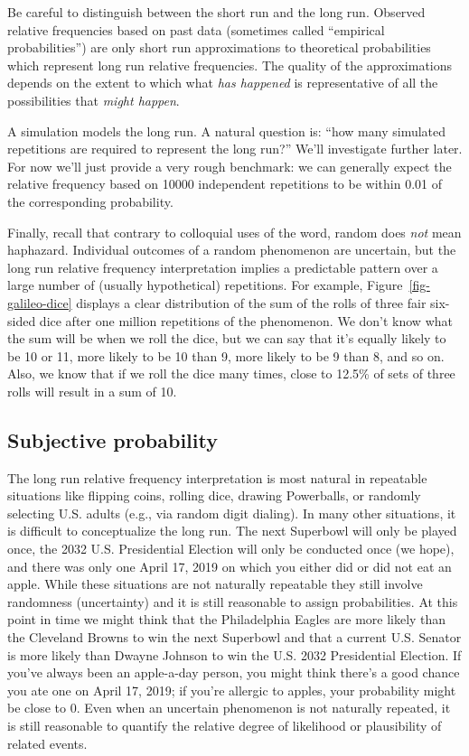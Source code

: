 \documentclass[
  letterpaper,
  DIV=11,
  numbers=noendperiod]{scrreprt}
\theoremstyle{plain}
\theoremstyle{definition}
\theoremstyle{definition}
\theoremstyle{definition}
\theoremstyle{remark}
\begin{document}
Be careful to distinguish between the short run and the long run.
Observed relative frequencies based on past data (sometimes called
``empirical probabilities'') are only short run approximations to
theoretical probabilities which represent long run relative frequencies.
The quality of the approximations depends on the extent to which what
\emph{has happened} is representative of all the possibilities that
\emph{might happen}.

A simulation models the long run. A natural question is: ``how many
simulated repetitions are required to represent the long run?'' We'll
investigate further later. For now we'll just provide a very rough
benchmark: we can generally expect the relative frequency based on 10000
independent repetitions to be within 0.01 of the corresponding
probability.

Finally, recall that contrary to colloquial uses of the word, random
does \emph{not} mean haphazard. Individual outcomes of a random
phenomenon are uncertain, but the long run relative frequency
interpretation implies a predictable pattern over a large number of
(usually hypothetical) repetitions. For example,
Figure~\ref{fig-galileo-dice} displays a clear distribution of the sum
of the rolls of three fair six-sided dice after one million repetitions
of the phenomenon. We don't know what the sum will be when we roll the
dice, but we can say that it's equally likely to be 10 or 11, more
likely to be 10 than 9, more likely to be 9 than 8, and so on. Also, we
know that if we roll the dice many times, close to 12.5\% of sets of
three rolls will result in a sum of 10.

\subsection{Subjective probability}\label{sec-subjective-probability}

The long run relative frequency interpretation is most natural in
repeatable situations like flipping coins, rolling dice, drawing
Powerballs, or randomly selecting U.S. adults (e.g., via random digit
dialing). In many other situations, it is difficult to conceptualize the
long run. The next Superbowl will only be played once, the 2032 U.S.
Presidential Election will only be conducted once (we hope), and there
was only one April 17, 2019 on which you either did or did not eat an
apple. While these situations are not naturally repeatable they still
involve randomness (uncertainty) and it is still reasonable to assign
probabilities. At this point in time we might think that the
Philadelphia Eagles are more likely than the Cleveland Browns to win the
next Superbowl and that a current U.S. Senator is more likely than
Dwayne Johnson to win the U.S. 2032 Presidential Election. If you've
always been an apple-a-day person, you might think there's a good chance
you ate one on April 17, 2019; if you're allergic to apples, your
probability might be close to 0. Even when an uncertain phenomenon is
not naturally repeated, it is still reasonable to quantify the relative
degree of likelihood or plausibility of related events.
\end{document}

